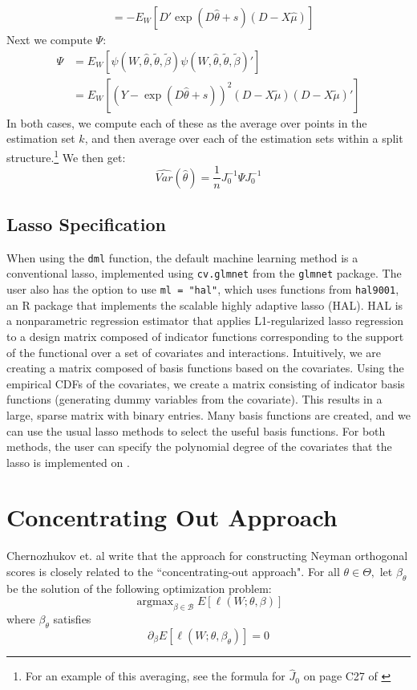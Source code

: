 \documentclass[11pt]{article}
\DeclareMathOperator*{\argmax}{argmax}
\begin{document}
\begin{enumerate}
\begin{align*}
		&= -E_W\left[D'\exp(D\hat{\theta} + s)(D - X\hat{\mu}) \right]
	\end{align*}
	Next we compute $\Psi$:
	\begin{align*}
		\Psi &= E_W\left[\psi(W, \hat{\theta},\tilde{\theta}, \tilde{\beta})\psi(W, \hat{\theta},\tilde{\theta}, \tilde{\beta})'\right] \\
			&= E_W\left[(Y - \exp(D\hat{\theta} + s))^2(D - X\tilde{\mu})(D - X\tilde{\mu})'\right]
	\end{align*}
	In both cases, we compute each of these as the average over points in the estimation set $k$, and then average over each of the estimation sets within a split structure.\footnote{For an example of this averaging, see the formula for $\hat{J}_0$ on page C27 of \citet{chernozhukov_doubledebiased_2018}} We then get:
	$$\hat{Var}(\hat{\theta}) = \frac{1}{n} J_0^{-1} \Psi J_0^{-1}$$

\end{enumerate}

\subsection{Lasso Specification}
When using the \verb|dml| function, the default machine learning method is a conventional lasso, implemented using \verb|cv.glmnet| from the \verb|glmnet| package. The user also has the option to use \verb|ml = "hal"|, which uses functions from \verb|hal9001|, an R package that implements the scalable highly adaptive lasso (HAL). HAL is a nonparametric regression estimator that applies L1-regularized lasso regression to a design matrix composed of indicator functions corresponding to the support of the functional over a set of covariates and interactions. Intuitively, we are creating a matrix composed of basis functions based on the covariates. Using the empirical CDFs of the covariates, we create a matrix consisting of indicator basis functions (generating dummy variables from the covariate). This results in a large, sparse matrix with binary entries. Many basis functions are created, and we can use the usual lasso methods to select the useful basis functions. For both methods, the user can specify the polynomial degree of the covariates that the lasso is implemented on \citep{coyle_hal9001_2020}.

\section{Concentrating Out Approach}
Chernozhukov et. al write that the approach for constructing Neyman orthogonal scores is closely related to the ``concentrating-out approach". For all $\theta \in \Theta,$ let $\beta_{\theta}$ be the solution of the following optimization problem:
$$
\argmax_{\beta \in \mathcal{B}} E[\ell(W ; \theta, \beta)]
$$
where $\beta_\theta$ satisfies
$$\partial_{\beta} E\left[\ell\left(W ; \theta, \beta_{\theta}\right)\right]=0$$
\end{document}
